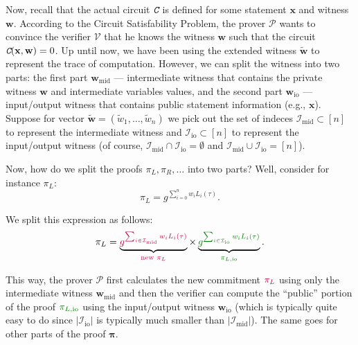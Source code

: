 \documentclass[../lecture-notes.tex]{subfiles}
\begin{document}
Now, recall that the actual circuit $\textit{\texttt{C}}$ is defined for some statement $\mathbf{x}$ and witness $\mathbf{w}$. According to the Circuit Satisfability Problem, 
the prover $\mathcal{P}$ wants to convince the verifier $\mathcal{V}$ that he knows the witness $\mathbf{w}$ 
such that the circuit $\textit{\texttt{C}}(\mathbf{x}, \mathbf{w}) = 0$. Up until now, we have been using 
the extended witness $\widetilde{\mathbf{w}}$ to represent the trace of computation. 
However, we can split the witness into two parts: the first part $\mathbf{w}_{\text{mid}}$ --- intermediate witness 
that contains the private witness $\mathbf{w}$ and intermediate variables values, and 
the second part $\mathbf{w}_{\text{io}}$ --- input/output witness that contains public 
statement information (e.g., $\mathbf{x}$). Suppose for vector $\widetilde{\mathbf{w}} = (\widetilde{w}_1,\dots,\widetilde{w}_n)$ 
we pick out the set of indeces $\mathcal{I}_{\text{mid}} \subset [n]$ to represent the intermediate witness 
and $\mathcal{I}_{\text{io}} \subset [n]$ to represent the input/output witness 
(of course, $\mathcal{I}_{\text{mid}} \cap \mathcal{I}_{\text{io}} = \emptyset$ 
and $\mathcal{I}_{\text{mid}} \cup \mathcal{I}_{\text{io}} = [n]$).

Now, how do we split the proofs $\pi_L,\pi_R,\dots$ into two parts? Well, consider for instance $\pi_L$:
\begin{equation*}
    \pi_L = g^{\sum_{i=0}^n w_iL_i(\tau)}.
\end{equation*}

We split this expression as follows:
\begin{equation*}
    \pi_L = \underbrace{\textcolor{purple}{g^{\sum_{i \in \mathcal{I}_{\text{mid}}} w_iL_i(\tau)}}}_{\textcolor{purple}{\text{new $\pi_L$}}} 
    \times 
    \underbrace{\textcolor{green!50!black}{g^{\sum_{i \in \mathcal{I}_{\text{io}}} w_iL_i(\tau)}}}_{\textcolor{green!50!black}{\pi_{L,\text{io}}}}.
\end{equation*}

This way, the prover $\mathcal{P}$ first calculates the new commitment $\textcolor{purple}{\pi_L}$ using 
only the intermediate witness $\mathbf{w}_{\text{mid}}$ and then 
the verifier can compute the ``public'' portion of the proof $\textcolor{green!50!black}{\pi_{L,\text{io}}}$ 
using the input/output witness $\mathbf{w}_{\text{io}}$ 
(which is typically quite easy to do since $|\mathcal{I}_{\text{io}}|$ is typically much smaller than 
$|\mathcal{I}_{\text{mid}}|$). The same goes for other parts of the proof $\boldsymbol{\pi}$.
\end{document}

